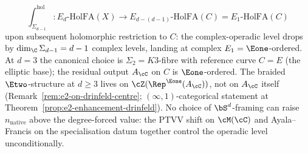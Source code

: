 \begin{proposition}
\[
 \int_{\Sigma_{d-1}}^{\mathrm{hol}} \colon E_d\text{-HolFA}(X) \longrightarrow E_{d - (d-1)}\text{-HolFA}(C) = E_1\text{-HolFA}(C)
\]
upon subsequent holomorphic restriction to $C$: the complex-operadic level drops by $\dim_\C \Sigma_{d-1} = d - 1$ complex levels, landing at complex $E_1 = \Eone$-ordered. At $d = 3$ the canonical choice is $\Sigma_2 = K3$-fibre with reference curve $C = E$ \textup{(}the elliptic base\textup{);} the residual output $A_\cC$ on $C$ is $\Eone$-ordered. The braided $\Etwo$-structure at $d \geq 3$ lives on $\cZ(\Rep^{\Eone}(A_\cC))$, not on $A_\cC$ itself \textup{(}Remark~\ref{rem:e2-on-drinfeld-centre}; $(\infty,1)$-categorical statement at Theorem~\ref{prop:e2-enhancement-drinfeld}\textup{).} No choice of $\bS^d$-framing can raise $n_{\mathrm{native}}$ above the degree-forced value: the PTVV shift on $\cM(\cC)$ and Ayala--Francis on the specialisation datum together control the operadic level unconditionally.
\end{proposition}

